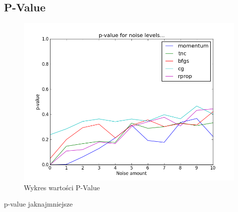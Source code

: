 \documentclass[a4paper]{article}
\begin{document}
\subsection{P-Value}
\begin{figure}[pht]
 \centering
 \includegraphics[scale=0.5]{../compare_plots/compare_plot_p_value}
 \caption{Wykres wartości P-Value}\label{rys:plot1}
\end{figure}
p-value jaknajmniejsze
\end{document}

